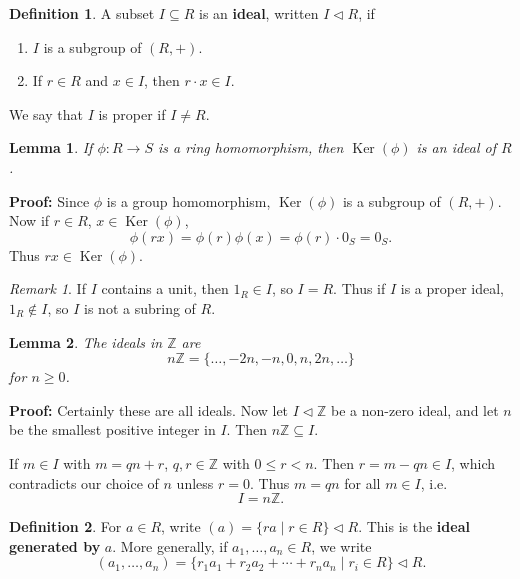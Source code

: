 \documentclass[12pt]{article}
\DeclareMathOperator{\Ker}{Ker}
\newtheorem{lemma}{Lemma}[section]
\theoremstyle{definition}
\newtheorem{definition}{Definition}[section]
\theoremstyle{remark}
\newtheorem*{remark}{Remark}
\begin{document}
\begin{definition}
	A subset $I \subseteq R$ is an \textbf{ideal}, written $I \lhd R$, if
	\begin{enumerate}[label = (\roman*)]
		\item $I$ is a subgroup of $(R, +)$.
		\item If $r \in R$ and $x \in I$, then $r \cdot x \in I$.
	\end{enumerate}
	We say that $I$ is proper if $I \neq R$.
\end{definition}

\begin{lemma}
	If $\phi : R \to S$ is a ring homomorphism, then $\Ker(\phi)$ is an ideal of $R$.
\end{lemma}

\begin{adjustbox}{minipage = \columnwidth - 25.5pt, margin=1em, frame=1pt, margin=0em}
	\textbf{Proof:} Since $\phi$ is a group homomorphism, $\Ker(\phi)$ is a subgroup of $(R, +)$. Now if $r \in R$, $x \in \Ker(\phi)$,
	\[
		\phi(rx) = \phi(r)\phi(x) = \phi(r) \cdot 0_{S} = 0_{S}
	.\]
	Thus $rx \in \Ker(\phi)$.
\end{adjustbox}

\begin{remark}
	If $I$ contains a unit, then $1_{R} \in I$, so $I = R$. Thus if $I$ is a proper ideal, $1_{R} \not \in I$, so $I$ is not a subring of $R$.
\end{remark}

\begin{lemma}
	The ideals in $\mathbb{Z}$ are
	\[
		n \mathbb{Z} = \{\ldots, -2n, -n, 0, n, 2n, \ldots\}
	\]
	for $n \geq 0$.
\end{lemma}

\begin{adjustbox}{minipage = \columnwidth - 25.5pt, margin=1em, frame=1pt, margin=0em}
\textbf{Proof:} Certainly these are all ideals. Now let $I \lhd \mathbb{Z}$ be a non-zero ideal, and let $n$ be the smallest positive integer in $I$. Then $n \mathbb{Z} \subseteq I$.

If $m \in I$ with $m = qn + r$, $q, r \in \mathbb{Z}$ with $0 \leq r < n$. Then $r = m - qn \in I$, which contradicts our choice of $n$ unless $r = 0$. Thus $m = qn$ for all $m \in I$, i.e.
\[
I = n \mathbb{Z}
.\]
\end{adjustbox}

\begin{definition}
	For $a \in R$, write $(a) = \{ra \mid r \in R\} \lhd R$. This is the \textbf{ideal generated by} $a$. More generally, if $a_1, \ldots, a_n \in R$, we write
	\[
		(a_1, \ldots, a_n) = \{r_1a_1 + r_2a_2 + \cdots + r_na_n \mid r_i \in R\} \lhd R
	.\]
\end{definition}
\end{document}
